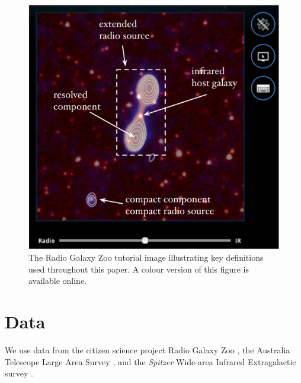 \documentclass[fleqn,usenatbib,usedcolumn]{mnras}
\begin{document}
  \begin{figure}
  \begin{center}
    \includegraphics[width=0.75\linewidth]{images/fig1.png}
    \caption{The Radio Galaxy Zoo tutorial image illustrating key definitions
      used throughout this paper. A colour version of this figure is available
      online.}\label{fig1}
  \end{center}
  \end{figure}

\section{Data}\label{sec:data}

  We use data from the citizen science project Radio Galaxy Zoo
  \citep{banfield15}, the Australia Telescope Large Area Survey
  \citep[ATLAS;][]{norris06,franzen15}, and the \emph{Spitzer} Wide-area Infrared
  Extragalactic survey \citep[SWIRE;][]{lonsdale03swire, surace05swire}.
\end{document}
